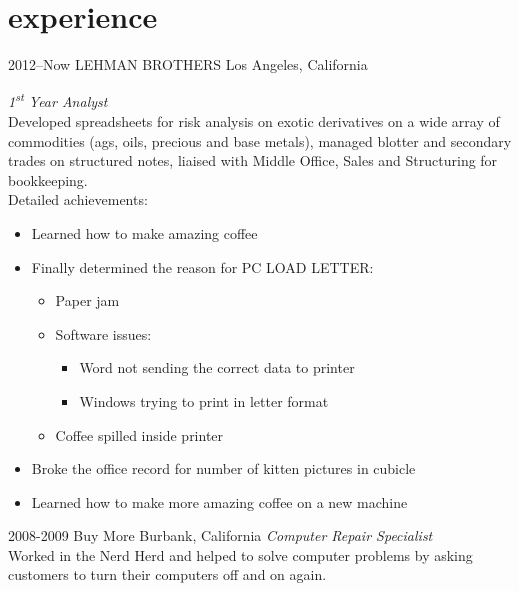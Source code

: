 \documentclass[]{friggeri-cv} %
\begin{document}

\section{experience}

\begin{entrylist}


\entry
{2012--Now}
{LEHMAN BROTHERS}
{Los Angeles, California}
{\emph{1\textsuperscript{st} Year Analyst} \\
Developed spreadsheets for risk analysis on exotic derivatives on a wide array of commodities (ags, oils, precious and base metals), managed blotter and secondary trades on structured notes, liaised with Middle Office, Sales and Structuring for bookkeeping. \\
Detailed achievements:
\begin{itemize}
\item Learned how to make amazing coffee
\item Finally determined the reason for \textsc{PC LOAD LETTER}:
\begin{itemize}
\item Paper jam
\item Software issues:
\begin{itemize}
\item Word not sending the correct data to printer
\item Windows trying to print in letter format
\end{itemize}
\item Coffee spilled inside printer
\end{itemize}
\item Broke the office record for number of kitten pictures in cubicle
\item Learned how to make more amazing coffee on a new machine
\end{itemize}}

\entry
{2008-2009}
{Buy More}
{Burbank, California}
{\emph{Computer Repair Specialist} \\
Worked in the Nerd Herd and helped to solve computer problems by asking customers to turn their computers off and on again.}


\end{entrylist}
\end{document}
